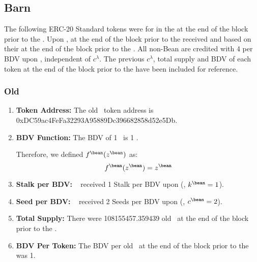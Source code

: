\documentclass[class=article, crop=false]{standalone}
\begin{document}
\subsection{Barn}
\vspace*{-1.5mm}
The following ERC-20 Standard tokens were  for  in the  at the end of the block prior to the . Upon ,  at the end of the block prior to the  received  and  based on their  at the end of the block prior to the . All non-Bean  are credited with 4  per BDV upon , independent of $c^{\lambda}$. The previous $c^{\lambda}$, total supply and BDV of each token at the end of the block prior to the  have been included for reference. 

\vspace*{-1.5mm}
\subsubsection{Old \Bean}
\vspace*{-1.5mm}
\begin{enumerate}
        \item \textbf{Token Address:} The old \Bean\ token address is 0xDC59ac4FeFa32293A95889Dc396682858d52e5Db.
        \item \textbf{BDV Function:} The BDV of 1 \Bean\ is 1 \Bean. 
        
Therefore, we defined $f^{\bean}(z^{\bean})$ as:
            $$f^{\bean}(z^{\bean}) = z^{\bean}$$
        \item \textbf{Stalk per BDV:} \Bean\  received 1 Stalk per BDV upon  (, $k^{\bean} = 1$).
        \item \textbf{Seed per BDV:} \Bean\  received 2 Seeds per BDV upon  (, $c^{\bean} = 2$).
        \item \textbf{Total Supply:} There were 108155457.359439 old \Bean\ at the end of the block prior to the .
        \item \textbf{BDV Per Token:} The BDV per old \Bean\ at the end of the block prior to the  was 1.
    \end{enumerate}

\vspace{-1.5mm}
\end{document}
